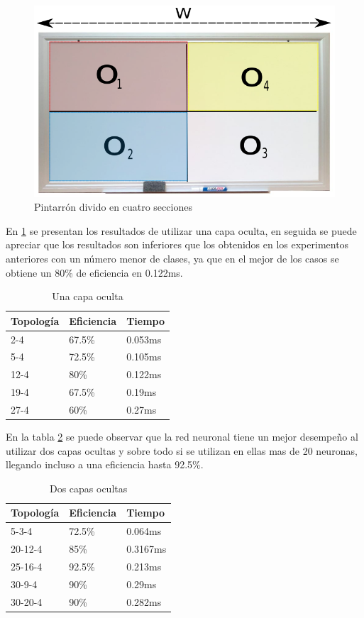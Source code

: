 \begin{figure}[htbp] 
	\centering
	\includegraphics[width=.3\textwidth]{./pictures/pint3}
	\caption{Pintarrón divido en cuatro secciones}\label{fig: pint3}
\end{figure}

En \ref{tab:unaCapa4} se presentan los resultados de utilizar una capa oculta, en seguida se puede apreciar que los resultados son inferiores que los obtenidos en los experimentos anteriores con un número menor de clases, ya que en el mejor de los casos se obtiene un 80\% de eficiencia en 0.122ms.
\begin{table}[]
	\centering
	\caption{Una capa oculta}
	\label{my-label}
	\begin{tabular}{|l|l|l|}
		\hline
		Topología & Eficiencia & Tiempo  \\ \hline
		2-4       & 67.5\%     & 0.053ms \\ \hline
		5-4       & 72.5\%     & 0.105ms \\ \hline
		12-4      & 80\%       & 0.122ms \\ \hline
		19-4      & 67.5\%     & 0.19ms  \\ \hline
		27-4      & 60\%       & 0.27ms  \\ \hline
	\end{tabular}\label{tab:unaCapa4}
\end{table}

En la tabla \ref{tab:dosCapa4} se puede observar que la red neuronal tiene un mejor desempeño al utilizar dos capas ocultas y sobre todo si se utilizan en ellas mas de 20 neuronas, llegando incluso a una eficiencia hasta 92.5\%.

\begin{table}[]
	\centering
	\caption{Dos capas ocultas}
	\label{my-label}
	\begin{tabular}{|l|l|l|}
		\hline
		Topología & Eficiencia & Tiempo   \\ \hline
		5-3-4     & 72.5\%     & 0.064ms  \\ \hline
		20-12-4   & 85\%       & 0.3167ms \\ \hline
		25-16-4   & 92.5\%     & 0.213ms  \\ \hline
		30-9-4    & 90\%       & 0.29ms   \\ \hline
		30-20-4   & 90\%       & 0.282ms  \\ \hline
	\end{tabular}\label{tab:dosCapa4}
\end{table}

